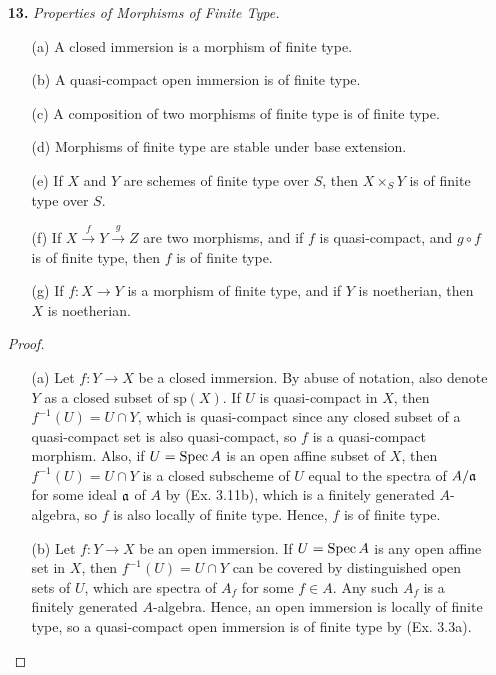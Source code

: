 \documentclass{article}
\begin{document}
\begin{enumerate} [label=\textbf{\arabic*.}, leftmargin=0em]
\item[\textbf{13.}] \textit{Properties of Morphisms of Finite Type.}
\begin{itemize}
    \item[(a)] A closed immersion is a morphism of finite type.
    \item[(b)] A quasi-compact open immersion is of finite type.
    \item[(c)] A composition of two morphisms of finite type is of finite type.
    \item[(d)] Morphisms of finite type are stable under base extension.
    \item[(e)] If $X$ and $Y$ are schemes of finite type over $S$, then $X \times_S Y$ is of finite type over $S$.
    \item[(f)] If $X \xrightarrow{f} Y \xrightarrow{g} Z$ are two morphisms, and if $f$ is quasi-compact, and $g \circ f$ is of finite type, then $f$ is of finite type.
    \item[(g)] If $f : X \to Y$ is a morphism of finite type, and if $Y$ is noetherian, then $X$ is noetherian.
\end{itemize}

\begin{proof} $ $ \vspace{0pt}
   \begin{itemize} [leftmargin=0cm]
    \item[(a)] Let $f : Y \to X$ be a closed immersion. By abuse of notation, also denote $Y$ as a closed subset of $\text{sp}(X)$. If $U$ is quasi-compact in $X$, then $f^{-1}(U) = U \cap Y$, which is quasi-compact since any closed subset of a quasi-compact set is also quasi-compact, so $f$ is a quasi-compact morphism. Also, if $U = \operatorname{Spec}{A}$ is an open affine subset of $X$, then $f^{-1}(U) = U \cap Y$ is a closed subscheme of $U$ equal to the spectra of $A/ \mathfrak{a}$ for some ideal $\mathfrak{a}$ of $A$ by (Ex. 3.11b), which is a finitely generated $A$-algebra, so $f$ is also locally of finite type. Hence, $f$ is of finite type.

    \item[(b)] Let $f : Y \to X$ be an open immersion. If $U = \operatorname{Spec}{A}$ is any open affine set in $X$, then $f^{-1}(U) = U \cap Y$ can be covered by distinguished open sets of $U$, which are spectra of $A_f$ for some $f \in A$. Any such $A_f$ is a finitely generated $A$-algebra. Hence, an open immersion is locally of finite type, so a quasi-compact open immersion is of finite type by (Ex. 3.3a).


\end{itemize}
\end{proof}
\end{enumerate}
\end{document}
